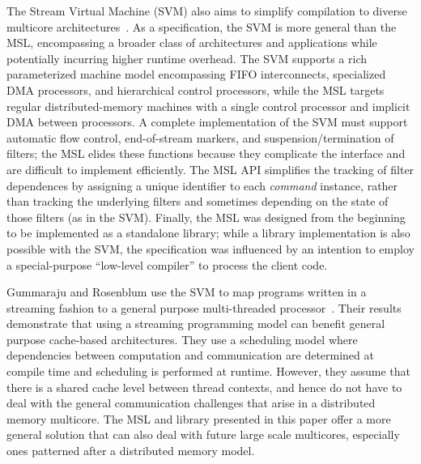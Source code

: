 The Stream Virtual Machine (SVM) also aims to simplify compilation to
diverse multicore architectures~\cite{svm:specs,svm}.  As a specification,
the SVM is more general than the MSL, encompassing a broader class of
architectures and applications while potentially incurring higher
runtime overhead.  The SVM supports a rich parameterized machine model
encompassing FIFO interconnects, specialized DMA processors, and
hierarchical control processors, while the MSL targets regular
distributed-memory machines with a single control processor and
implicit DMA between processors.  A complete implementation of the SVM
must support automatic flow control, end-of-stream markers, and
suspension/termination of filters; the MSL elides these functions
because they complicate the interface and are difficult to implement
efficiently.  The MSL API simplifies the tracking of filter
dependences by assigning a unique identifier to each {\it command}
instance, rather than tracking the underlying filters and sometimes
depending on the state of those filters (as in the SVM).  Finally, the
MSL was designed from the beginning to be implemented as a standalone
library; while a library implementation is also possible with the SVM,
the specification was influenced by an intention to employ a
special-purpose ``low-level compiler'' to process the client code.

Gummaraju and Rosenblum use the SVM to map programs written in a
streaming fashion to a general purpose multi-threaded
processor~\cite{streamgpp}. Their results demonstrate that using a
streaming programming model can benefit general purpose cache-based
architectures. They use a scheduling model where dependencies between
computation and communication are determined at compile time and
scheduling is performed at runtime. However, they assume that there is
a shared cache level between thread contexts, and hence do not have to
deal with the general communication challenges that arise in a
distributed memory multicore. The MSL and library presented in this
paper offer a more general solution that can also deal with future
large scale multicores, especially ones patterned after a distributed
memory model.


